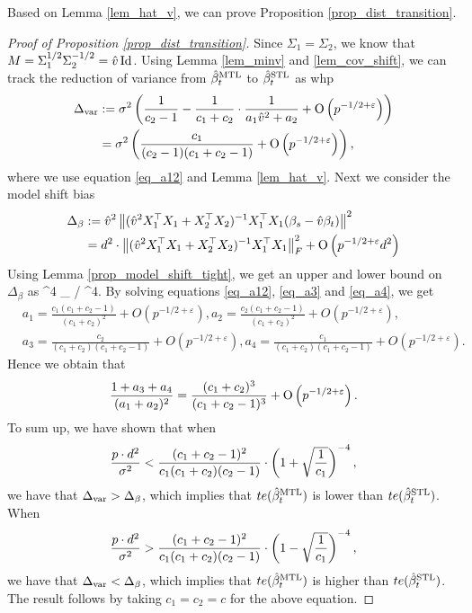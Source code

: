 Based on Lemma \ref{lem_hat_v}, we can prove Proposition \ref{prop_dist_transition}.
\begin{proof}[Proof of Proposition \ref{prop_dist_transition}]
	Since $\Sigma_1 = \Sigma_2$, we know that $M = \Sigma_1^{1/2}\Sigma_2^{-1/2} = \hat{v} \operatorname{Id}$.
	Using Lemma \ref{lem_minv} and \ref{lem_cov_shift}, we can track the reduction of variance from $\hat{\beta}_t^{\text{MTL}}$ to $\hat{\beta}_t^{\text{STL}}$ as whp
	\begin{align}
		\Delta_{\text{var}} &:= \sigma^2 \left({\frac{1}{c_2 - 1} - \frac{1}{c_1 + c_2}\cdot\frac{1}{a_1\hat{v}^2 + a_2} + \operatorname{O}\left(p^{-1/2+\varepsilon}\right)}\right) \nonumber\\
		&= \sigma^2 \left({\frac{c_1}{(c_2-1)(c_1 + c_2 -1)} + \operatorname{O}\left(p^{-1/2 + \varepsilon}\right)}\right),\label{Deltavar}
	\end{align}
	where we use equation \eqref{eq_a12} and Lemma \ref{lem_hat_v}.
	Next we consider the model shift bias
	\begin{align*}
		\Delta_{\beta} &:= \hat{v}^2 \left\| (\hat{v}^2 X_1^{\top}X_1 + X_2^{\top}X_2)^{-1} X_1^{\top}X_1 (\beta_s - \hat{v}\beta_t) \right\|^2 \\
		&= d^2 \cdot \left\| (\hat{v}^2 X_1^{\top}X_1 + X_2^{\top}X_2)^{-1}X_1^{\top}X_1 \right\|_{F}^2 + \operatorname{O}\left(p^{-1/2 + \varepsilon}d^2\right)
	\end{align*}
	Using Lemma \ref{prop_model_shift_tight}, we get an upper and lower bound on $\Delta_{\beta}$ as
	\be\label{Deltabeta} ^4 \le \Delta_{\beta} /  \le {}^4. \ee
	By solving equations \eqref{eq_a12}, \eqref{eq_a3} and \eqref{eq_a4}, we get
	\begin{align}
		& a_1 = \frac{c_1(c_1 + c_2 - 1)}{(c_1 + c_2)^2} + O(p^{-1/2 + \varepsilon}),
		a_2 = \frac{c_2(c_1 + c_2 - 1)}{(c_1 + c_2)^2} + O(p^{-1/2 + \varepsilon}), \label{simplesovlea12}\\
		& a_3 = \frac{c_2}{(c_1 + c_2)(c_1 + c_2 - 1)} + O(p^{-1/2 + \varepsilon}),
		a_4 = \frac{c_1}{(c_1 + c_2)(c_1 + c_2 - 1)} + O(p^{-1/2 + \varepsilon}).\label{simplesovlea34}
	\end{align}
	Hence we obtain that
	\begin{align*}
		\frac{1 + a_3 + a_4}{(a_1 + a_2)^2}
		= \frac{(c_1 + c_2)^3}{(c_1 + c_2 - 1)^3} + \operatorname{O}\left(p^{-1/2+\varepsilon}\right).
	\end{align*}
	To sum up, we have shown that when
	\[ \frac{p\cdot d^2}{\sigma^2} < \frac{(c_1 + c_2 - 1)^2}{c_1(c_1 + c_2) (c_2 - 1)} \cdot \left({1 + \sqrt{\frac 1 {c_1}}}\right)^{-4}, \]
	we have that $\Delta_{\text{var}} > \Delta_{\beta}$, which implies that $te(\hat{\beta}_t^{\text{MTL}})$ is lower than $te(\hat{\beta}_t^{\text{STL}})$.
	When
	\[ \frac{p\cdot d^2}{\sigma^2} > \frac{(c_1 + c_2 - 1)^2}{c_1 (c_1 + c_2) (c_2 - 1)} \cdot \left({1 - \sqrt{\frac 1 {c_1}}}\right)^{-4}, \]
	we have that $\Delta_{\text{var}} < \Delta_{\beta}$, which implies that $te(\hat{\beta}_t^{\text{MTL}})$ is higher than $te(\hat{\beta}_t^{\text{STL}})$.
	The result follows by taking $c_1 = c_2 = c$ for the above equation.
\end{proof}

